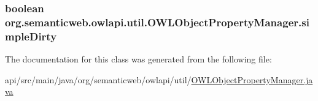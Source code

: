 \hypertarget{classorg_1_1semanticweb_1_1owlapi_1_1util_1_1_o_w_l_object_property_manager_afdf81d56f9291810536ff30f897d1970}{
\subsubsection[{simple\-Dirty}]{\setlength{\rightskip}{0pt plus 5cm}boolean org.\-semanticweb.\-owlapi.\-util.\-O\-W\-L\-Object\-Property\-Manager.\-simple\-Dirty\hspace{0.3cm}{\ttfamily [private]}}}\label{classorg_1_1semanticweb_1_1owlapi_1_1util_1_1_o_w_l_object_property_manager_afdf81d56f9291810536ff30f897d1970}


The documentation for this class was generated from the following file\-:\begin{DoxyCompactItemize}
\item 
api/src/main/java/org/semanticweb/owlapi/util/\hyperlink{_o_w_l_object_property_manager_8java}{O\-W\-L\-Object\-Property\-Manager.\-java}\end{DoxyCompactItemize}
